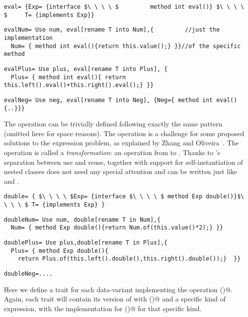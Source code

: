 \begin{lstlisting}
eval= {Exp= {interface $\ \ \ \ $         method int eval()} $\ \ \ \ $     T= {implements Exp}}
\end{lstlisting}
\multiCode
\begin{lstlisting}
evalNum= Use num, eval[rename T into Num],{         //just the implementation
  Num= { method int eval(){return this.value();} }}//of the specific method
\end{lstlisting}
\multiCode
\begin{lstlisting}
evalPlus= Use plus, eval[rename T into Plus], {
  Plus= { method int eval(){ return this.left().eval()+this.right().eval();} }}
\end{lstlisting}
\multiCode
\begin{lstlisting}
evalNeg= Use neg, eval[rename T into Neg], {Neg={ method int eval(){..}}}
\end{lstlisting}

The \Q@show@ operation can be trivially defined
following exactly the same pattern (omitted here for space reasons).
The operation \Q@double@ is a challenge for some proposed solutions
to the expression problem, as explained by Zhang and Oliveira~\cite{zhang2017evf}.
The \Q@double@ operation is called a \emph{transformation}: an operation from \Q@Exp@ to \Q@Exp@.
Thanks to \name's separation between use and reuse,
together with support
for self-instantiation of nested classes
\Q@double@ does not need any special attention
and can be written just like \Q@eval@ and \Q@show@.
\begin{lstlisting}
double= { $\ \ \ \ $Exp= {interface $\ \ \ \ $ method Exp double()}$\ \ \ \ $ T= {implements Exp} }
\end{lstlisting}
\multiCode
\begin{lstlisting}
doubleNum= Use num, double[rename T in Num],{
  Num= { method Exp double(){return Num.of(this.value()*2);} }}
\end{lstlisting}
\multiCode
\begin{lstlisting}
doublePlus= Use plus,double[rename T in Plus],{
  Plus= { method Exp double(){
    return Plus.of(this.left().double(),this.right().double());}  }}
\end{lstlisting}
\multiCode
\begin{lstlisting}
doubleNeg=....
\end{lstlisting}
Here we define a trait for each data-variant implementing the operation \Q@double()@.
Again, each trait will contain its version of \Q@Exp@ with \Q@double()@
and a specific kind of expression, with the implementation for \Q@double()@
for that specific kind.


